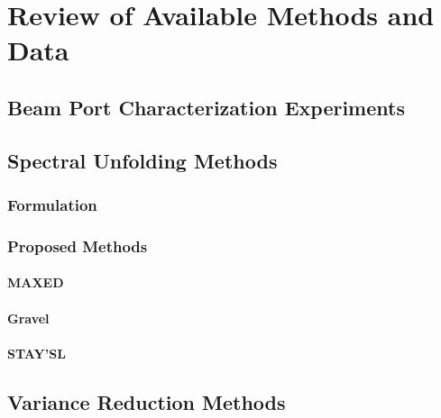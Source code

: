 \cleardoublepage

\chapter{Review of Available Methods and Data}


\section{Beam Port Characterization Experiments}



\section{Spectral Unfolding Methods}

\subsection{Formulation}

\subsection{Proposed Methods}

\subsubsection{MAXED}

\subsubsection{Gravel}


\subsubsection{STAY'SL}




\section{Variance Reduction Methods}

